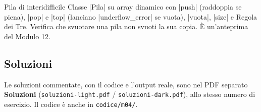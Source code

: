 \begin{esercizio}{Pila di interi}{difficile}
Classe \cc|Pila| su array dinamico con \cc|push| (raddoppia se piena), \cc|pop| e
\cc|top| (lanciano \cc|underflow_error| se vuota), \cc|vuota|, \cc|size| e Regola
dei Tre. Verifica che svuotare una pila non svuoti la sua copia. È un'anteprima del
Modulo 12.
\end{esercizio}

\subsection*{Soluzioni}
Le soluzioni commentate, con il codice e l'output reale, sono nel PDF separato
\textbf{Soluzioni} (\texttt{soluzioni-light.pdf} / \texttt{soluzioni-dark.pdf}),
allo stesso numero di esercizio. Il codice è anche in \texttt{codice/m04/}.
